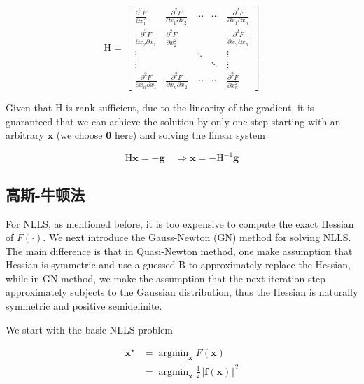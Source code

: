 \begin{equation}
    \mathrm{H} \doteq \begin{bmatrix}
        \frac{\partial^2 F}{\partial x_1^2} &
        \frac{\partial^2 F}{\partial x_1 \partial x_2} &
        \cdots & \cdots &
        \frac{\partial^2 F}{\partial x_1 \partial x_n} \\
        \frac{\partial^2 F}{\partial x_2 \partial x_1} &
        \frac{\partial^2 F}{\partial x_2^2} &
        & &
        \frac{\partial^2 F}{\partial x_2 \partial x_n} \\
        \vdots & & \ddots & & \vdots \\
        \vdots & & & \ddots & \vdots \\
        \frac{\partial^2 F}{\partial x_n \partial x_1} &
        \frac{\partial^2 F}{\partial x_n \partial x_2} &
        \cdots & \cdots &
        \frac{\partial^2 F}{\partial x_n^2}
    \end{bmatrix}
\end{equation}

Given that $\mathrm{H}$ is rank-sufficient, due to the linearity of the gradient, it is guaranteed that we can achieve the solution by only one step starting with an arbitrary $\bm{x}$ (we choose $\bm{0}$ here) and solving the linear system

\begin{equation}
    \mathrm{H} \bm{x} = -\bm{g} \quad
    \Rightarrow \bm{x} = -\mathrm{H}^{-1} \bm{g}
\end{equation}

\subsection{高斯-牛顿法}\label{sec:gn}

For NLLS, as mentioned before, it is too expensive to compute the exact Hessian of $F(\cdot)$. We next introduce the Gauss-Newton (GN) method for solving NLLS. The main difference is that in Quasi-Newton method, one make assumption that Hessian is symmetric and use a guessed $\mathrm{B}$ to approximately replace the Hessian, while in GN method, we make the assumption that the next iteration step approximately subjects to the Gaussian distribution, thus the Hessian is naturally symmetric and positive semidefinite.

We start with the basic NLLS problem

\begin{equation}\label{eq:nlls}
\begin{aligned}
    \bm{x}^\star &= \mathop{\arg\min}_{\bm{x}} F(\bm{x}) \\
                 &= \mathop{\arg\min}_{\bm{x}}
                    \frac{1}{2} \Vert \mathbf{f}(\bm{x}) \Vert^2
\end{aligned}
\end{equation}

